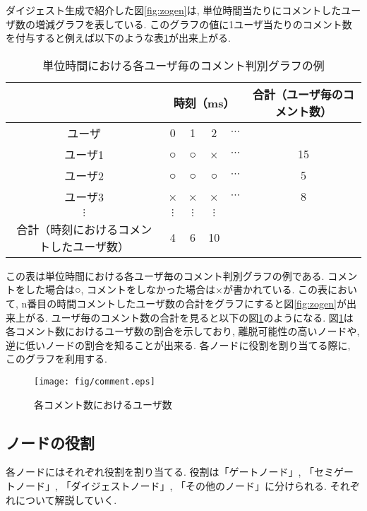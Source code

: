 ダイジェスト生成で紹介した図\ref{fig:zogen}は, 単位時間当たりにコメントしたユーザ数の増減グラフを表している. このグラフの値に1ユーザ当たりのコメント数を付与すると例えば以下のような表\ref{tbl:user-comment}が出来上がる.

\begin{table}[h]
  \caption{単位時間における各ユーザ毎のコメント判別グラフの例}
  \label{tbl:user-comment}
  \centering
      {\small
        \begin{tabular}{|c||c|c|c|c|c|} \hline
          & \multicolumn{4}{|c|}{時刻（ms）} & 合計（ユーザ毎のコメント数） \\ \hline \hline
          ユーザ & 0 & 1 & 2 & $\cdots$ & \\ \hline \hline
          ユーザ1 & ○ & ○ & × & $\cdots$ & 15 \\ \hline
          ユーザ2 & ○ & ○ & ○ & $\cdots$ & 5 \\ \hline
          ユーザ3 & × & × & × & $\cdots$ & 8 \\ \hline
          $\vdots$ & $\vdots$ & $\vdots$ & $\vdots$ & &  \\ \hline
          合計（時刻におけるコメントしたユーザ数） & 4 & 6 & 10 & &  \\ \hline
        \end{tabular}
      }
\end{table}

この表は単位時間における各ユーザ毎のコメント判別グラフの例である. コメントをした場合は○, コメントをしなかった場合は×が書かれている. この表において, n番目の時間コメントしたユーザ数の合計をグラフにすると図\ref{fig:zogen}が出来上がる. ユーザ毎のコメント数の合計を見ると以下の図\ref{fig:comment}のようになる. 図\ref{fig:comment}は各コメント数におけるユーザ数の割合を示しており, 離脱可能性の高いノードや, 逆に低いノードの割合を知ることが出来る. 各ノードに役割を割り当てる際に, このグラフを利用する.

\begin{figure}[h]
  \centering
  \texttt{[image: fig/comment.eps]}
  \caption{各コメント数におけるユーザ数}
  \label{fig:comment}
\end{figure}

\newpage

\subsection{ノードの役割}
各ノードにはそれぞれ役割を割り当てる. 役割は「ゲートノード」, 「セミゲートノード」, 「ダイジェストノード」, 「その他のノード」に分けられる. それぞれについて解説していく.


